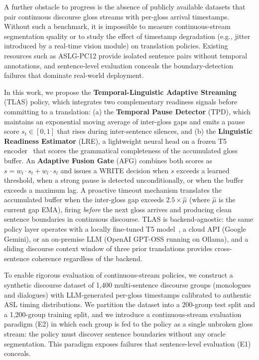 \documentclass[conference]{IEEEtran}
\begin{document}
A further obstacle to progress is the absence of publicly available datasets that pair continuous discourse gloss streams with per-gloss arrival timestamps. Without such a benchmark, it is impossible to measure continuous-stream segmentation quality or to study the effect of timestamp degradation (e.g., jitter introduced by a real-time vision module) on translation policies. Existing resources such as ASLG-PC12 \cite{othman2012english} provide isolated sentence pairs without temporal annotations, and sentence-level evaluation conceals the boundary-detection failures that dominate real-world deployment.

In this work, we propose the \textbf{Temporal-Linguistic Adaptive Streaming} (TLAS) policy, which integrates two complementary readiness signals before committing to a translation: (a) the \textbf{Temporal Pause Detector} (TPD), which maintains an exponential moving average of inter-gloss gaps and emits a pause score $s_t \in [0,1]$ that rises during inter-sentence silences, and (b) the \textbf{Linguistic Readiness Estimator} (LRE), a lightweight neural head on a frozen T5 encoder~\cite{raffel2020exploring} that scores the grammatical completeness of the accumulated gloss buffer. An \textbf{Adaptive Fusion Gate} (AFG) combines both scores as $s = w_t \cdot s_t + w_l \cdot s_l$ and issues a WRITE decision when $s$ exceeds a learned threshold, when a strong pause is detected unconditionally, or when the buffer exceeds a maximum lag. A proactive timeout mechanism translates the accumulated buffer when the inter-gloss gap exceeds $2.5 \times \hat{\mu}$ (where $\hat{\mu}$ is the current gap EMA), firing \emph{before} the next gloss arrives and producing clean sentence boundaries in continuous discourse. TLAS is backend-agnostic: the same policy layer operates with a locally fine-tuned T5 model~\cite{raffel2020exploring}, a cloud API (Google Gemini), or an on-premise LLM (OpenAI GPT-OSS running on Ollama), and a sliding discourse context window of three prior translations provides cross-sentence coherence regardless of the backend.

To enable rigorous evaluation of continuous-stream policies, we construct a synthetic discourse dataset of 1,400 multi-sentence discourse groups (monologues and dialogues) with LLM-generated per-gloss timestamps calibrated to authentic ASL timing distributions. We partition the dataset into a 200-group test split and a 1,200-group training split, and we introduce a continuous-stream evaluation paradigm (E2) in which each group is fed to the policy as a single unbroken gloss stream: the policy must discover sentence boundaries without any oracle segmentation. This paradigm exposes failures that sentence-level evaluation (E1) conceals.
\end{document}
